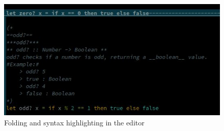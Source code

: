 \begin{figure}
    \includegraphics[width=\textwidth]{images/vim.jpg}
    {\caption{Folding and syntax highlighting in the editor}}
\label{fig:foldVim}
\end{figure}
